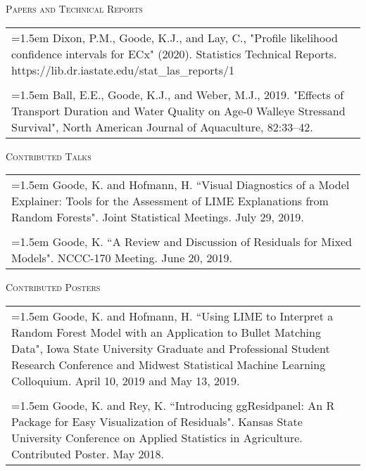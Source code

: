 \documentclass[10pt, oneside]{article}
\begin{document}
\newpage

\noindent \textsc{Papers and Technical Reports} \hrulefill
\begin{longtable}{p{16.5cm}}
\hangindent=1.5em Dixon, P.M., Goode, K.J., and Lay, C., "Profile likelihood confidence intervals for ECx" (2020). Statistics Technical Reports. https://lib.dr.iastate.edu/stat\_las\_reports/1\\
\\
\hangindent=1.5em Ball, E.E., Goode, K.J., and Weber, M.J., 2019. "Effects of Transport Duration and Water Quality on Age-0 Walleye Stressand Survival", North American Journal of Aquaculture, 82:33–42.
\end{longtable}

\noindent \textsc{Contributed Talks} \hrulefill
\begin{longtable}{p{16.5cm}}
\hangindent=1.5em Goode, K. and Hofmann, H. ``Visual Diagnostics of a Model Explainer: Tools for the Assessment of LIME Explanations from Random Forests". Joint Statistical Meetings. July 29, 2019.\\
\\
\hangindent=1.5em Goode, K. ``A Review and Discussion of Residuals for Mixed Models". NCCC-170 Meeting. June 20, 2019.
\end{longtable}

\noindent \textsc{Contributed Posters} \hrulefill
\begin{longtable}{p{16.5cm}}
\hangindent=1.5em Goode, K. and Hofmann, H. ``Using LIME to Interpret a Random Forest Model with an Application to Bullet Matching Data", Iowa State University Graduate and Professional Student Research Conference and Midwest Statistical Machine Learning Colloquium. April 10, 2019 and May 13, 2019.\\
\\ 
\hangindent=1.5em Goode, K. and Rey, K. ``Introducing ggResidpanel: An R Package for Easy Visualization of Residuals". Kansas State University Conference on Applied Statistics in Agriculture. Contributed Poster. May 2018.
\end{longtable}
\end{document}
